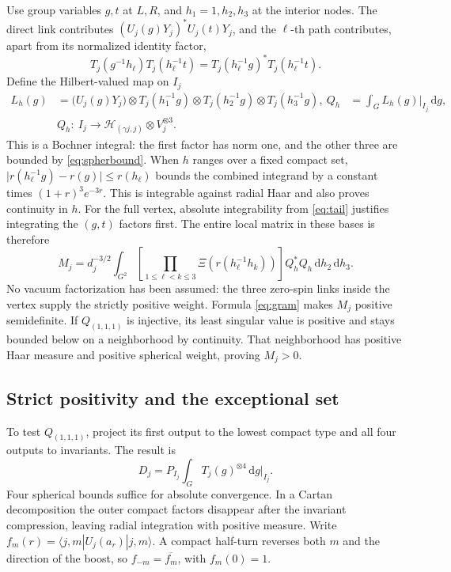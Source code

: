 \documentclass[11pt]{article}
\theoremstyle{remark}
\newcommand{\dd}{\mathrm d}
\newcommand{\bH}{\mathcal H}
\begin{document}
Use group variables \(g,t\) at \(L,R\), and \(h_1=1,h_2,h_3\) at the interior nodes. The direct link contributes
\((U_j(g)Y_j)^*U_j(t)Y_j\), and the \(\ell\)-th path contributes, apart from its normalized identity factor,
\[
T_j(g^{-1}h_\ell)T_j(h_\ell^{-1}t)=T_j(h_\ell^{-1}g)^*T_j(h_\ell^{-1}t).
\]
Define the Hilbert-valued map on \(I_j\)
\begin{align}
L_h(g)&=\big(U_j(g)Y_j\big)\otimes T_j(h_1^{-1}g)\otimes
 T_j(h_2^{-1}g)\otimes T_j(h_3^{-1}g),\
Q_h&=\int_G L_h(g)\big|_{I_j}\,\dd g,\\
   &Q_h:\ I_j\longrightarrow\bH_{(\gamma j,j)}\otimes V_j^{\otimes3}.
\end{align}
This is a Bochner integral: the first factor has norm one, and the other three are bounded by \eqref{eq:spherbound}. When \(h\) ranges over a fixed compact set,
\(\big|r(h_\ell^{-1}g)-r(g)\big|\le r(h_\ell)\) bounds the combined integrand by a constant times \((1+r)^3e^{-3r}\). This is integrable against radial Haar and also proves continuity in \(h\). For the full vertex, absolute integrability from \eqref{eq:tail} justifies integrating the \((g,t)\) factors first. The entire local matrix in these bases is therefore
\begin{equation}\label{eq:gram}
M_j=d_j^{-3/2}\int_{G^2}
  \left[\prod_{1\le \ell<k\le3}\Xi(r(h_\ell^{-1}h_k))\right]
  Q_h^*Q_h\,\dd h_2\,\dd h_3 .
\end{equation}
No vacuum factorization has been assumed: the three zero-spin links inside the vertex supply the strictly positive weight. Formula \eqref{eq:gram} makes \(M_j\) positive semidefinite. If \(Q_{(1,1,1)}\) is injective, its least singular value is positive and stays bounded below on a neighborhood by continuity. That neighborhood has positive Haar measure and positive spherical weight, proving \(M_j>0\).

\subsection{Strict positivity and the exceptional set}

To test \(Q_{(1,1,1)}\), project its first output to the lowest compact type and all four outputs to invariants. The result is
\begin{equation}\label{eq:D}
D_j=P_{I_j}\int_G T_j(g)^{\otimes4}\,\dd g\big|_{I_j}.
\end{equation}
Four spherical bounds suffice for absolute convergence. In a Cartan decomposition the outer compact factors disappear after the invariant compression, leaving radial integration with positive measure. Write
\(f_m(r)=\langle j,m|U_j(a_r)|j,m\rangle\).
A compact half-turn reverses both \(m\) and the direction of the boost, so \(f_{-m}=\overline{f_m}\), with \(f_m(0)=1\).
\end{document}
